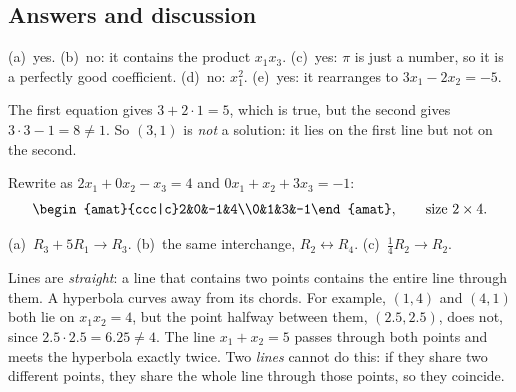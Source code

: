 \documentclass[11pt]{article}
\begin{document}
\subsection*{Answers and discussion}
\begin{description}[leftmargin=0pt,itemsep=5pt]
  \item[Knowledge Check \ref{kc:linear}.] (a)~yes. (b)~no: it contains the product $x_1x_3$.
        (c)~yes: $\pi$ is just a number, so it is a perfectly good coefficient. (d)~no: $x_1^2$.
        (e)~yes: it rearranges to $3x_1-2x_2=-5$.
  \item[Knowledge Check \ref{kc:candidate}.] The first equation gives $3+2\cdot1=5$, which is true,
        but the second gives $3\cdot3-1=8\neq1$. So $(3,1)$ is \emph{not} a solution: it lies on the
        first line but not on the second.
  \item[Knowledge Check \ref{kc:augmented}.] Rewrite as $2x_1+0x_2-x_3=4$ and $0x_1+x_2+3x_3=-1$:
        \[\begin{amat}{ccc|c}2&0&-1&4\\0&1&3&-1\end{amat},\qquad\text{size }2\times4.\]
  \item[Knowledge Check \ref{kc:undo}.] (a)~$R_3+5R_1\to R_3$. (b)~the same interchange,
        $R_2\leftrightarrow R_4$. (c)~$\tfrac14R_2\to R_2$.
  \item[Pause and think \ref{think:lines}.] Lines are \emph{straight}: a line that contains two
        points contains the entire line through them. A hyperbola curves away from its chords. For
        example, $(1,4)$ and $(4,1)$ both lie on $x_1x_2=4$, but the point halfway between them,
        $(2.5,2.5)$, does not, since $2.5\cdot2.5=6.25\neq4$. The line $x_1+x_2=5$ passes through both
        points and meets the hyperbola exactly twice. Two \emph{lines} cannot do this: if they share
        two different points, they share the whole line through those points, so they coincide.
 

\end{description}
\end{document}
